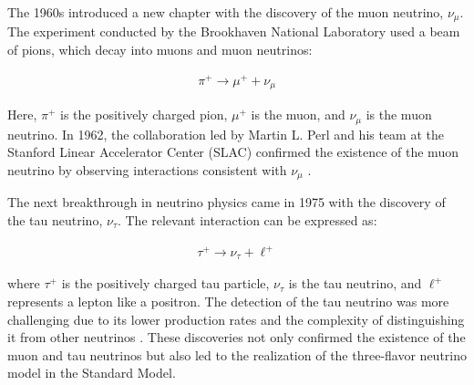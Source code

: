 The 1960s introduced a new chapter with the discovery of the muon neutrino, $\nu_\mu$.
The experiment conducted by the Brookhaven National Laboratory used a beam of pions, which decay into muons and muon neutrinos:

\begin{align}
  \pi^+ \rightarrow \mu^+ + \nu_\mu
\end{align}

Here, $\pi^+$ is the positively charged pion, $\mu^+$ is the muon, and $\nu_\mu$ is the muon neutrino.
In 1962, the collaboration led by Martin L. Perl and his team at the Stanford Linear Accelerator Center (SLAC) confirmed the existence of the muon neutrino by observing interactions consistent with $\nu_\mu$ \cite{muon_neutrino_discovery}.

The next breakthrough in neutrino physics came in 1975 with the discovery of the tau neutrino, $\nu_\tau$.
The relevant interaction can be expressed as:

\begin{align}
  \tau^+ \rightarrow \nu_\tau + \ell^+
\end{align}

where $\tau^+$ is the positively charged tau particle, $\nu_\tau$ is the tau neutrino, and $\ell^+$ represents a lepton like a positron.
The detection of the tau neutrino was more challenging due to its lower production rates and the complexity of distinguishing it from other neutrinos \cite{tau_neutrino_discovery}.
These discoveries not only confirmed the existence of the muon and tau neutrinos but also led to the realization of the three-flavor neutrino model in the Standard Model.

